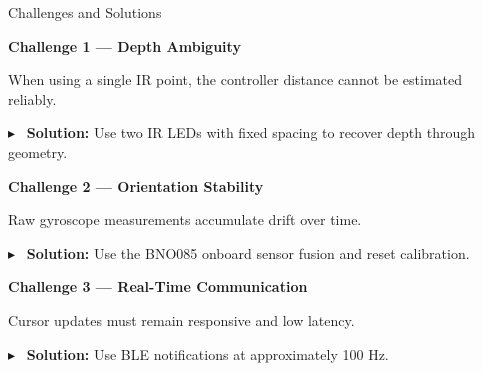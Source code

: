 \documentclass[aspectratio=169]{beamer}
\begin{document}
\begin{frame}{Challenges and Solutions}

\small

\textbf{Challenge 1 — Depth Ambiguity}

\vspace{0.08cm}

When using a single IR point, the controller distance cannot be estimated reliably.

\vspace{0.08cm}

$\blacktriangleright$ \ {\color[rgb]{0.0,0.24,0.45}\textbf{Solution:}} Use two IR LEDs with fixed spacing to recover depth through geometry.

\vspace{0.2cm}

\textbf{Challenge 2 — Orientation Stability}

\vspace{0.08cm}

Raw gyroscope measurements accumulate drift over time.

\vspace{0.08cm}

$\blacktriangleright$ \ {\color[rgb]{0.0,0.24,0.45}\textbf{Solution:}} Use the BNO085 onboard sensor fusion and reset calibration.

\vspace{0.2cm}

\textbf{Challenge 3 — Real-Time Communication}

\vspace{0.08cm}

Cursor updates must remain responsive and low latency.

\vspace{0.08cm}

$\blacktriangleright$ \ {\color[rgb]{0.0,0.24,0.45}\textbf{Solution:}} Use BLE notifications at approximately 100 Hz.

\vspace{0.2cm}

\end{frame}


\end{document}

